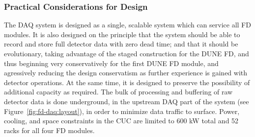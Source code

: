  

\subsubsection{Practical Considerations for Design}

The DAQ system is designed as a single, scalable system which can service
all FD modules. It is also designed on the principle that the system should be
able to record and store full detector data with zero dead time; and
that it should be evolutionary, taking advantage of the staged
construction for the DUNE FD, and thus beginning very conservatively
for the first DUNE FD module, and agressively reducing the design
conservatism as further experience is gained with detector
operations. At the same time, it is designed to preserve the possibility of additional capacity
as required. The bulk of processing and buffering of raw detector data is
done underground, in the upstream DAQ part of the system (see Figure~\ref{fig:fd-daq:layout}), in order to
minimize data traffic to surface. Power, cooling, and space
constraints in the CUC are limited to 600 kW total and 52 racks for all four FD
modules.

